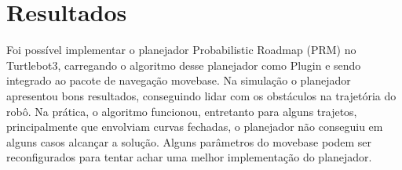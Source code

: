 \chapter{Resultados}
\label{chap:result}
Foi possível implementar o planejador Probabilistic Roadmap (PRM) no Turtlebot3, carregando o algoritmo desse planejador como Plugin e sendo integrado ao pacote de navegação move\textunderscore base. Na simulação o planejador apresentou bons resultados, conseguindo lidar com os obstáculos na trajetória do robô. Na prática, o algoritmo funcionou, entretanto para alguns trajetos, principalmente que envolviam curvas fechadas, o planejador não conseguiu em alguns casos alcançar a solução. Alguns parâmetros do move\textunderscore base podem ser reconfigurados para tentar achar uma melhor implementação do planejador.






